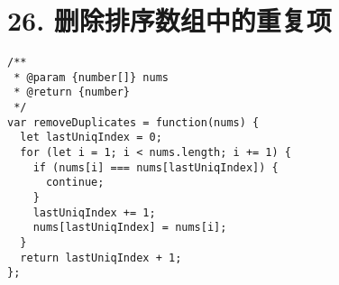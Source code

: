 \newpage
\section{26. 删除排序数组中的重复项}
\label{leetcode:26}

\begin{verbatim}
/**
 * @param {number[]} nums
 * @return {number}
 */
var removeDuplicates = function(nums) {
  let lastUniqIndex = 0;
  for (let i = 1; i < nums.length; i += 1) {
    if (nums[i] === nums[lastUniqIndex]) {
      continue;
    }
    lastUniqIndex += 1;
    nums[lastUniqIndex] = nums[i];
  }
  return lastUniqIndex + 1;
};
\end{verbatim}
